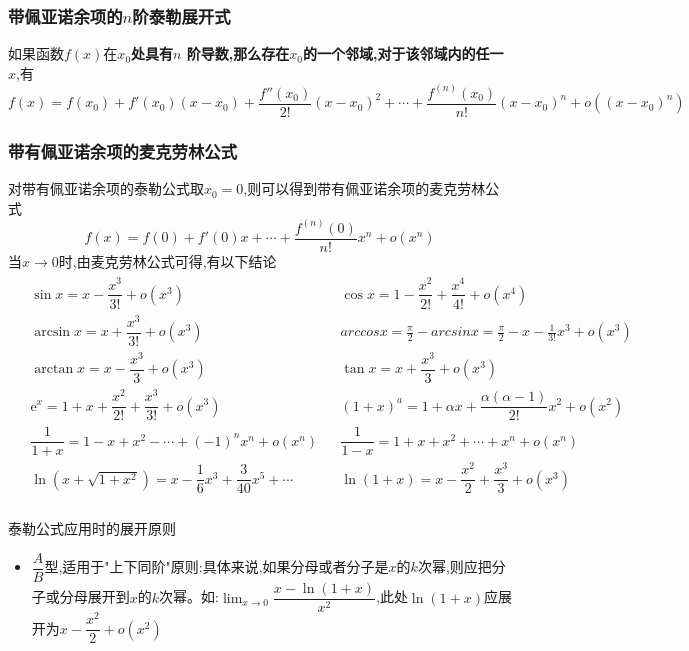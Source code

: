 \documentclass[12pt, a4paper, oneside, UTF8]{ctexbook}
\begin{document}
\begin{sloppypar}
    \subsubsection{带佩亚诺余项的$n$阶泰勒展开式}
    如果函数$f(x)$在\textbf{$x_0$处具有$n$ 阶导数,那么存在$x_{0}$的一个邻域,对于该邻域内的任一 $x$},有
    $$
    f(x)=f(x_{0})+f'(x_{0})(x-x_{0})+\dfrac{f''(x_{0})}{2!}(x-x_{0})^{2}+\cdots+\dfrac{f^{(n)}(x_{0})}{n!}(x-x_{0})^{n}+o\left(\left(x-x_{0}\right)^{n}\right)
    $$
    \subsubsection{带有佩亚诺余项的麦克劳林公式}
    对带有佩亚诺余项的泰勒公式取$x_0=0$,则可以得到带有佩亚诺余项的麦克劳林公式
    $$
    f(x)=f(0)+f'(0)x+\cdots+\dfrac{f^{(n)}(0)}{n!}x^{n}+o(x^{n})
    $$
    当$x\to 0$时,由麦克劳林公式可得,有以下结论
    \begin{align*}
        \boxed{\begin{aligned}
                        & \sin x =x-\dfrac{x^3}{3!}+o(x^3)                                &  & \cos x =1-\dfrac{x^2}{2!}+\dfrac{x^4}{4!}+o(x^4)                  \\
                        & \arcsin x =x+\dfrac{x^3}{3!}+o(x^3)                             &  &                              arccosx=\frac\pi2-arcsinx=\frac\pi2-x-\frac1{3!}x^3+o(x^3)       \\
                        & \arctan x =x-\dfrac{x^{3}}{3}+o(x^{3})                          &  & \tan x =x+\dfrac{x^3}3+o(x^3)              \\
                        & \mathrm{e}^{x} =1+x+\dfrac{x^{2}}{2!}+\dfrac{x^{3}}{3!}+o(x^{3}) &  & (1+x)^{a} =1+\alpha x+\dfrac{\alpha(\alpha-1)}{2!}x^{2}+o(x^{2}) \\
                        & \dfrac{1}{1+x}=1-x+x^{2}-\cdots+(-1)^{n}x^{n}+o(x^{n})          &  &       \dfrac{1}{1-x}=1+x+x^{2}+\cdots+x^{n}+o(x^{n}) \\
                        & \ln (x+\sqrt{1+x^{2}})=x-\dfrac{1}{6}x^{3}+\dfrac{3}{40}x^{5}+\cdots  & & \ln(1+x) =x-\dfrac{x^{2}}{2}+\dfrac{x^{3}}{3}+o(x^{3}) \\
                    \end{aligned}}
    \end{align*}
    \begin{criterion}{泰勒公式应用时的展开原则}{}
        \begin{itemize}
            \item $\dfrac{A}{B}$型,适用于"上下同阶"原则:具体来说,如果分母或者分子是$x$的$k$次幂,则应把分子或分母展开到$x$的$k$次幂。如:$\lim_{x\to0}\dfrac{x-\ln(1+x)}{x^{2}}$,此处$\ln(1+x)$应展开为$x-\dfrac{x^2}{2}+o(x^2)$

\end{itemize}
\end{criterion}
\end{sloppypar}
\end{document}

